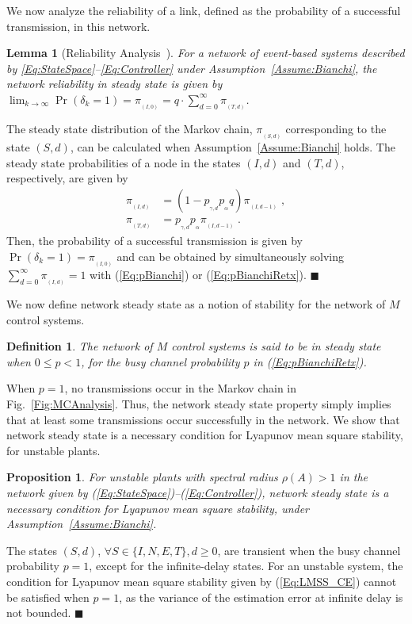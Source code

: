 \documentclass[twocolumn]{autart}
\newtheorem{lemma}[theorem]{Lemma}
\newtheorem{proposition}[theorem]{Proposition}
\newtheorem{definition}{Definition}[section]
\newenvironment{proof}[1][Proof]{\begin{trivlist}
\item[\hskip \labelsep {\bfseries #1}]}{\end{trivlist}}
\renewcommand{\qed}{$\blacksquare$}
\begin{document}
We now analyze the reliability of a link, defined as the probability of a successful transmission, in this network.
\begin{lemma}[Reliability Analysis~\cite{Ramesh2011b}] \label{Lemma:RelAnal}
For a network of event-based systems described by \eqref{Eq:StateSpace}--\eqref{Eq:Controller} under Assumption~\ref{Assume:Bianchi}, the network reliability in steady state is given by $\lim_{k \rightarrow \infty} \Pr(\delta_k=1) = \pi_{_{(I,0)}} = q \cdot \sum_{d=0}^{\infty} \pi_{_{(T,d)}}$.
\end{lemma}
\begin{proof}
The steady state distribution of the Markov chain, $\pi_{_{(S,d)}}$ corresponding to the state $(S,d)$, can be calculated when Assumption~\ref{Assume:Bianchi} holds. The steady state probabilities of a node in the states $(I,d)$ and $(T,d)$, respectively, are given by
\begin{align}
\pi_{_{(I,d)}} &= (1-p_{_{\gamma,d}} p_{_{\alpha}} q) \pi_{_{(I,d-1)}} \; , \label{Eq:pId} \\
\pi_{_{(T,d)}} &= p_{_{\gamma,d}} p_{_{\alpha}} \pi_{_{(I,d-1)}} \; . \label{Eq:pRd}
\end{align}
Then, the probability of a successful transmission is given by $\Pr(\delta_k=1) = \pi_{_{(I,0)}}$ and can be obtained by simultaneously solving $\sum_{d=0}^{\infty} \pi_{_{(I,d)}} = 1$ with (\ref{Eq:pBianchi}) or (\ref{Eq:pBianchiRetx}). \hfill \qed
\end{proof}

We now define network steady state as a notion of stability for the network of $M$ control systems.
\begin{definition} \label{Def:NetworkSS}
The network of $M$ control systems is said to be in steady state when $0 \le p < 1$, for the busy channel probability $p$ in (\ref{Eq:pBianchiRetx}).
\end{definition}

When $p=1$, no transmissions occur in the Markov chain in Fig.~\ref{Fig:MCAnalysis}. Thus, the network steady state property simply implies that at least some transmissions occur successfully in the network. We show that network steady state is a necessary condition for Lyapunov mean square stability, for unstable plants.
\begin{proposition} \label{Prop:SteadyStateNecForLMSS}
For unstable plants with spectral radius $\rho(A) > 1$ in the network given by (\ref{Eq:StateSpace})--(\ref{Eq:Controller}), network steady state is a necessary condition for Lyapunov mean square stability, under Assumption~\ref{Assume:Bianchi}.
\end{proposition}
\begin{proof}
The states $(S,d)$, $\forall S \in \{I,N,E,T\}, d \ge 0$, are transient when the busy channel probability $p = 1$, except for the infinite-delay states. For an unstable system, the condition for Lyapunov mean square stability given by (\ref{Eq:LMSS_CE}) cannot be satisfied when $p = 1$, as the variance of the estimation error at infinite delay is not bounded. \hfill \qed
\end{proof}
\end{document}
